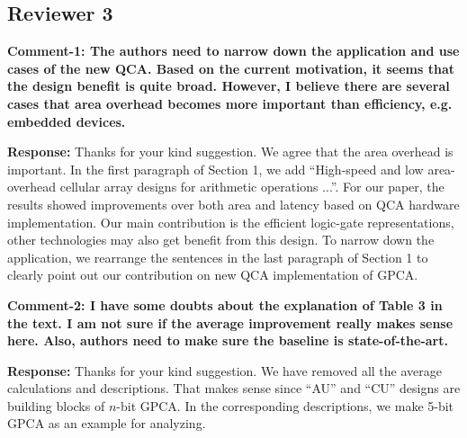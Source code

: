 \documentclass[9pt,journal,compsoc]{IEEEtran}
\begin{document}
\begin{appendices}
\subsection{ Reviewer 3}
{\bfseries Comment-1: The authors need to narrow down the application and use cases of the new QCA. Based on the current motivation, it seems that the design benefit is quite broad. However, I believe there are several cases that area overhead becomes more important than efficiency, e.g. embedded devices.}

{\bfseries Response:} Thanks for your kind suggestion. We agree that the area overhead is important. In the first paragraph of Section 1, we add ``High-speed and low area-overhead cellular array designs for arithmetic operations ...''. For our paper, the results showed improvements over both area and latency based on QCA hardware implementation. Our main contribution is the efficient logic-gate representations, other technologies may also get benefit from this design.
To narrow down the application, we rearrange the sentences in the last paragraph of Section 1 to clearly point out our contribution on new QCA implementation of GPCA.

{\bfseries Comment-2: I have some doubts about the explanation of Table 3 in the text. I am not sure if the average improvement really makes sense here. Also, authors need to make sure the baseline is state-of-the-art. }

{\bfseries Response:} Thanks for your kind suggestion. We have removed all the average calculations and descriptions. That makes sense since ``AU'' and ``CU'' designs are building blocks of $n$-bit GPCA. In the corresponding descriptions, we make 5-bit GPCA  as an example for analyzing.
\end{appendices} 
\end{document}
